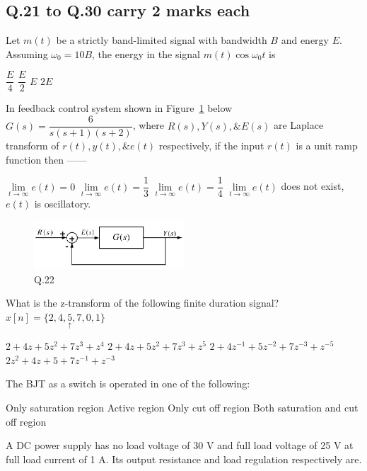\documentclass[a4, 12pt, addpoints]{exam}
\begin{document}
\begin{questions}
\section*{\normalsize Q.21 to Q.30 carry 2 marks each}
\question Let $m(t)$ be a strictly band-limited signal with bandwidth $B$ and energy $E$. Assuming $\omega_0 = 10B$, the energy in the signal $m(t) \cos \omega_0 t$ is\\[0.3cm]
\begin{oneparchoices}
\choice $\dfrac{E}{4}$
\choice $\dfrac{E}{2}$
\choice $E$
\choice $2E$
\end{oneparchoices}  
\question In feedback control system shown in Figure~\ref{q2} below $ G(s) = \dfrac{6}{s(s+1)(s+2)} $, where $R(s), Y(s), \& E(s)$ are Laplace transform of $r(t), y(t), \& e(t) $ respectively, if the input $r(t)$ is a unit ramp function then ------  \\[0.3cm]
\begin{oneparchoices}
\choice $\lim \limits_{t \to \infty } e(t) = 0$
\choice $\lim \limits_{t \to \infty } e(t) = \dfrac{1}{3}$
\choice $\lim \limits_{t \to \infty } e(t) = \dfrac{1}{4}$
\choice $\lim \limits_{t \to \infty } e(t) $ does not exist, $e(t)$ is oscillatory.
\end{oneparchoices}
\begin{figure}[h!]
\centering
\includegraphics[width=0.5\textwidth]{fbc.png}
\caption{Q.22}
\label{q2}
\end{figure}  
\question What is the z-transform of the following finite duration signal? $ x[n] = \{ 2, 4, \underset{\uparrow}{5}, 7, 0, 1 \} $\\[0.3cm]
\begin{oneparchoices}
\choice $ 2 + 4z + 5z^2 + 7z^3 + z^4  $
\choice $2 + 4z + 5z^2 + 7z^3 + z^5$
\choice $ 2 + 4z^{-1} + 5z^{-2} + 7z^{-3} + z^{-5} $
\choice $ 2z^2 + 4z + 5 +7z^{-1} + z^{-3}$
\end{oneparchoices}  
\question The BJT as a switch is  operated in one of the following:
\begin{oneparchoices}
\choice Only saturation region
\choice Active region
\choice Only cut off region
\choice Both saturation and cut off region
\end{oneparchoices}  
\question A DC power supply has no load voltage of 30 V and full load voltage of 25 V at full load current of 1 A. Its output resistance and load regulation respectively are. \\[0.3cm]

\end{questions}
\end{document}

